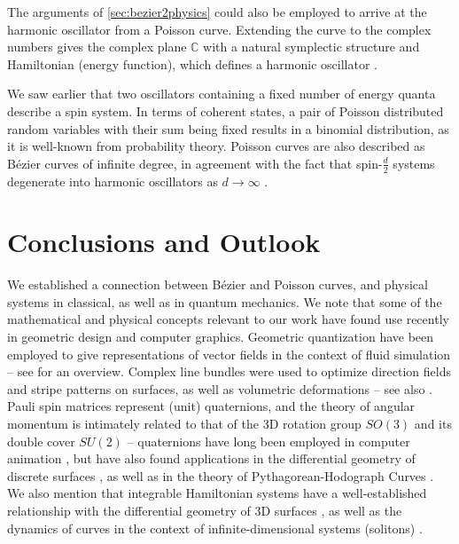 \documentclass[12pt,final,3p]{elsarticle}
\begin{document}
The arguments of \autoref{sec:bezier2physics} could also be employed to arrive at the harmonic oscillator from a Poisson curve. Extending the curve to the complex numbers gives the complex plane $\mathbb{C}$ with a natural symplectic structure and Hamiltonian (energy function), which defines a harmonic oscillator \cite{hall2013quantum}.

We saw earlier that two oscillators containing a fixed number of energy quanta describe a spin system. In terms of coherent states, a pair of Poisson distributed random variables with their sum being fixed results in a binomial distribution, as it is well-known from probability theory. Poisson curves are also described as B\'{e}zier curves of infinite degree, in agreement with the fact that spin-$\frac{d}{2}$ systems degenerate into harmonic oscillators as $d \rightarrow \infty$ \cite[Ch. 7.7]{combescure2012coherent}.

\section{Conclusions and Outlook}\label{sec:conc}
We established a connection between B\'{e}zier and Poisson curves, and physical systems in classical, as well as in quantum mechanics. We note that some of the mathematical and physical concepts relevant to our work have found use recently in geometric design and computer graphics. Geometric quantization have been employed to give representations of vector fields in the context of fluid simulation \cite{weissmann2014smoke,chern2016schrodinger,chern2017inside} -- see \cite{chern2017fluid} for an overview. Complex line bundles were used to optimize direction fields \cite{knoppel2013globally} and stripe patterns \cite{knoppel2015stripe} on surfaces, as well as volumetric deformations \cite{chern2015close} -- see also \cite{knoppel2016complex}. Pauli spin matrices represent (unit) quaternions, and the theory of angular momentum is intimately related to that of the 3D rotation group $SO(3)$ and its double cover $SU(2)$ -- quaternions have long been employed in computer animation \cite{hanson2006visualizing}, but have also found applications in the differential geometry of discrete surfaces \cite{bobenko1994surfaces,kamberov2002quaternions,crane2011spin,crane2013conformal,liu2017dirac,ye2018unified,hoffmann2018discrete,chern2018shape}, as well as in the theory of Pythagorean-Hodograph Curves \cite{choi2002clifford,farouki2008pythagorean}. We also mention that integrable Hamiltonian systems have a well-established relationship with the differential geometry of 3D surfaces \cite{terng2000geometry,rogers2002backlund,bobenko2008discrete}, as well as the dynamics of curves \cite{chou2002integrable,capovilla2002hamiltonians,sato2015generalization,inoguchi2018log,chern2018computing} in the context of infinite-dimensional systems (solitons) \cite{palais1997symmetries}. 
\end{document}
